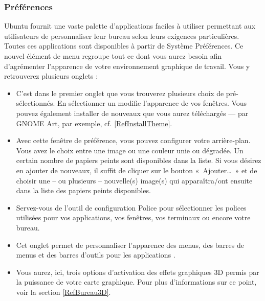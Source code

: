 \subsubsection{Préférences}
Ubuntu fournit une vaste palette d'applications faciles à utiliser permettant aux utilisateurs de personnaliser leur bureau selon leurs exigences particulières. Toutes ces applications sont disponibles à partir de Système \FlecheDroite Préférences. 
Ce nouvel élément de menu regroupe tout ce dont vous aurez besoin afin d'agrémenter l'apparence de votre environnement graphique de travail. Vous y retrouverez plusieurs onglets :
\begin{itemize}
\item C'est dans le premier onglet que vous trouverez plusieurs choix de  pré-sélectionnés. En sélectionner un modifie l'apparence de vos fenêtres. Vous pouvez également installer de nouveaux  que vous aurez téléchargés --- par GNOME Art, par exemple, cf. \ref{RefInstallTheme}.
\item Avec cette fenêtre de préférence, vous pouvez configurer votre arrière-plan. Vous avez le choix entre une image ou une couleur unie ou dégradée. Un certain nombre de papiers peints sont disponibles dans la liste. Si vous désirez en ajouter de nouveaux, il suffit de cliquer sur le bouton «~Ajouter\ldots{}~» et de choisir une -- ou plusieurs -- nouvelle(s) image(s) qui apparaîtra/ont ensuite dans la liste des papiers peints disponibles.
\item Servez-vous de l'outil de configuration Police pour sélectionner les polices utilisées pour vos applications, vos fenêtres, vos terminaux ou encore votre bureau. 
\item Cet onglet permet de personnaliser l'apparence des menus, des barres de menus et des barres d'outils pour les applications . 
\item Vous aurez, ici, trois options d'activation des effets graphiques 3D permis par la puissance de votre carte graphique. Pour plus d'informations sur ce point, voir la section \ref{RefBureau3D}.
\end{itemize}
